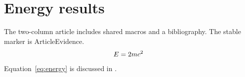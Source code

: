 \section{Energy results}\label{sec:energy}
The two-column article includes shared macros and a bibliography.
The stable marker is ArticleEvidence.
\begin{equation}\label{eq:energy}
E = 2 m c^2
\end{equation}
Equation~\ref{eq:energy} is discussed in \cite{corpus2026}.
